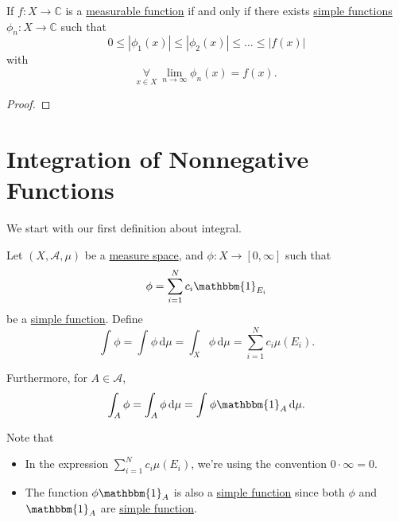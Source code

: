 \begin{corollary}
	If \(f\colon X\to \mathbb{C} \) is a \hyperref[def:measurable-function]{measurable function} if and only if there exists
	\hyperref[def:simple-function]{simple functions} \(\phi _{n}\colon X\to \mathbb{C}\) such that
	\[
		0\leq \left\vert \phi _1(x) \right\vert \leq \left\vert \phi _2(x) \right\vert \leq \dots \leq \left\vert f(x) \right\vert
	\]
	with
	\[
		\underset{x\in X}{\forall }\ \lim\limits_{n \to \infty} \phi _{n}(x) = f(x).
	\]
\end{corollary}
\begin{proof}
\end{proof}

\section{Integration of Nonnegative Functions}
We start with our first definition about integral.
\begin{definition}\label{def:integration-of-nonnegative-function}
	Let \((X, \mathcal{A}, \mu  )\) be a \hyperref[def:measure-space]{measure space}, and \(\phi\colon X\to [0, \infty ]\) such that
	\[
		\phi  = \sum\limits_{i=1}^{N} c_{i}\mathbbm{1}_{E_{i}}
	\]
	be a \hyperref[def:simple-function]{simple function}. Define
	\[
		\int_{}^{} \phi = \int_{}^{} \phi  \,\mathrm{d}\mu = \int_{X}^{} \phi  \,\mathrm{d}\mu = \sum\limits_{i=1}^{N} c_{i}\mu (E_{i}).
	\]

	\par Furthermore, for \(A\in \mathcal{A} \),
	\[
		\int_{A}^{} \phi = \int_{A}^{} \phi  \,\mathrm{d}\mu = \int_{}^{} \phi \mathbbm{1}_{A}  \,\mathrm{d}\mu.
	\]
\end{definition}
\begin{note}
	Note that
	\begin{itemize}
		\item In the expression \(\sum\limits_{i=1}^{N} c_{i}\mu (E_{i})\), we're using the convention \(0\cdot \infty = 0\).
		\item The function \(\phi \mathbbm{1}_{A} \) is also a \hyperref[def:simple-function]{simple function} since both \(\phi \) and
		      \(\mathbbm{1}_{A} \) are \hyperref[def:simple-function]{simple function}.
	\end{itemize}
\end{note}

